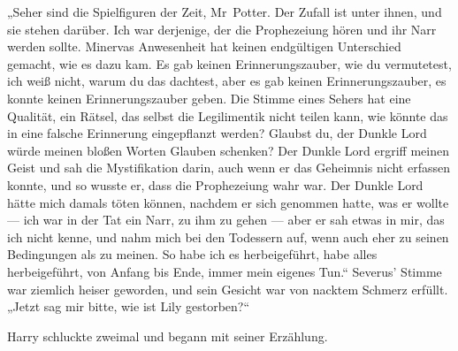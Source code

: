 „Seher sind die Spielfiguren der Zeit, Mr~Potter. Der Zufall ist unter ihnen, und sie stehen darüber. Ich war derjenige, der die Prophezeiung hören und ihr Narr werden sollte. Minervas Anwesenheit hat keinen endgültigen Unterschied gemacht, wie es dazu kam. Es gab keinen Erinnerungszauber, wie du vermutetest, ich weiß nicht, warum du das dachtest, aber es gab keinen Erinnerungszauber, es konnte keinen Erinnerungszauber geben. Die Stimme eines Sehers hat eine Qualität, ein Rätsel, das selbst die Legilimentik nicht teilen kann, wie könnte das in eine falsche Erinnerung eingepflanzt werden? Glaubst du, der Dunkle Lord würde meinen bloßen Worten Glauben schenken? Der Dunkle Lord ergriff meinen Geist und sah die Mystifikation darin, auch wenn er das Geheimnis nicht erfassen konnte, und so wusste er, dass die Prophezeiung wahr war. Der Dunkle Lord hätte mich damals töten können, nachdem er sich genommen hatte, was er wollte — ich war in der Tat ein Narr, zu ihm zu gehen — aber er sah etwas in mir, das ich nicht kenne, und nahm mich bei den Todessern auf, wenn auch eher zu seinen Bedingungen als zu meinen. So habe ich es herbeigeführt, habe alles herbeigeführt, von Anfang bis Ende, immer mein eigenes Tun.“
Severus’ Stimme war ziemlich heiser geworden, und sein Gesicht war von nacktem Schmerz erfüllt.
„Jetzt sag mir bitte, wie ist Lily gestorben?“

Harry schluckte zweimal und begann mit seiner Erzählung.


